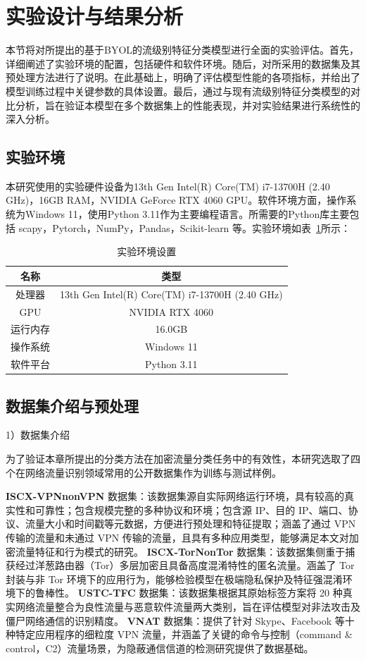 \section{实验设计与结果分析}
本节将对所提出的基于BYOL的流级别特征分类模型进行全面的实验评估。首先，详细阐述了实验环境的配置，包括硬件和软件环境。随后，对所采用的数据集及其预处理方法进行了说明。在此基础上，明确了评估模型性能的各项指标，并给出了模型训练过程中关键参数的具体设置。最后，通过与现有流级别特征分类模型的对比分析，旨在验证本模型在多个数据集上的性能表现，并对实验结果进行系统性的深入分析。
\subsection{实验环境}

本研究使用的实验硬件设备为13th Gen Intel(R) Core(TM) i7-13700H (2.40 GHz)，16GB RAM，NVIDIA GeForce RTX 4060 GPU。软件环境方面，操作系统为Windows 11，使用Python 3.11作为主要编程语言。所需要的Python库主要包括 scapy，Pytorch，NumPy，Pandas，Scikit-learn 等。实验环境如表~\ref{table:device}所示：
\begin{table}[h]
  \centering
  \caption{实验环境设置}
  \label{table:device}
  \begin{tabular}{cc}
    \hline
    \textbf{名称} & \textbf{类型} \\ \hline
    处理器 & 13th Gen Intel(R) Core(TM) i7-13700H (2.40 GHz) \\
    GPU & NVIDIA RTX 4060 \\
    运行内存 & 16.0GB \\
    操作系统 & Windows 11 \\
    软件平台 & Python 3.11 \\ \hline
  \end{tabular}
\end{table}
\subsection{数据集介绍与预处理}
1）数据集介绍

为了验证本章所提出的分类方法在加密流量分类任务中的有效性，本研究选取了四个在网络流量识别领域常用的公开数据集作为训练与测试样例。

\textbf{ISCX-VPNnonVPN} 数据集\cite{draper2016characterization}：该数据集源自实际网络运行环境，具有较高的真实性和可靠性；包含规模完整的多种协议和环境；包含源 IP、目的 IP、端口、协议、流量大小和时间戳等元数据，方便进行预处理和特征提取；涵盖了通过 VPN 传输的流量和未通过 VPN 传输的流量，且具有多种应用类型，能够满足本文对加密流量特征和行为模式的研究。
\textbf{ISCX-TorNonTor} 数据集\cite{lashkari2017characterization}：该数据集侧重于捕获经过洋葱路由器（Tor）多层加密且具备高度混淆特性的匿名流量。涵盖了 Tor 封装与非 Tor 环境下的应用行为，能够检验模型在极端隐私保护及特征强混淆环境下的鲁棒性。
\textbf{USTC-TFC} 数据集\cite{wang2017malware}：该数据集根据其原始标签方案将 20 种真实网络流量整合为良性流量与恶意软件流量两大类别，旨在评估模型对非法攻击及僵尸网络通信的识别精度。
\textbf{VNAT} 数据集\cite{jorgensen2023extensible}：提供了针对 Skype、Facebook 等十种特定应用程序的细粒度 VPN 流量，并涵盖了关键的命令与控制（command \& control，C2）流量场景，为隐蔽通信信道的检测研究提供了数据基础。

